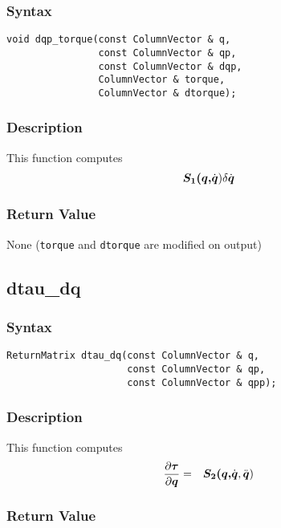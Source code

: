 \documentclass[dvips,11pt,fleqn]{report}
\newcommand{\mbold}[1]{\mbox{\boldmath $ #1 $}}
\newcommand{\dfdx}[2]{\frac{\partial #1}{\partial #2}}
\begin{document}
\subsubsection*{Syntax}
\begin{verbatim}
void dqp_torque(const ColumnVector & q, 
                const ColumnVector & qp,
                const ColumnVector & dqp, 
                ColumnVector & torque,
                ColumnVector & dtorque);
\end{verbatim}
\subsubsection*{Description}
This function computes 
\begin{eqnarray}
\mbold{S_1(q,}\dot{\mbold{q}}) \delta \dot{\mbold{q}}
\end{eqnarray}


\subsubsection*{Return Value}

None ({\tt torque} and {\tt dtorque} are modified on output)

\newpage

\subsection*{dtau\_dq}
\subsubsection*{Syntax}
\begin{verbatim}
ReturnMatrix dtau_dq(const ColumnVector & q, 
                     const ColumnVector & qp,
                     const ColumnVector & qpp);
\end{verbatim}
\subsubsection*{Description}
This function computes 
\begin{eqnarray}
\dfdx{\mbold{\tau}}{\mbold{q}} & = & \mbold{S_2(q,}\dot{\mbold{q}},\ddot{\mbold{q}})
\end{eqnarray}


\subsubsection*{Return Value}
\end{document}
